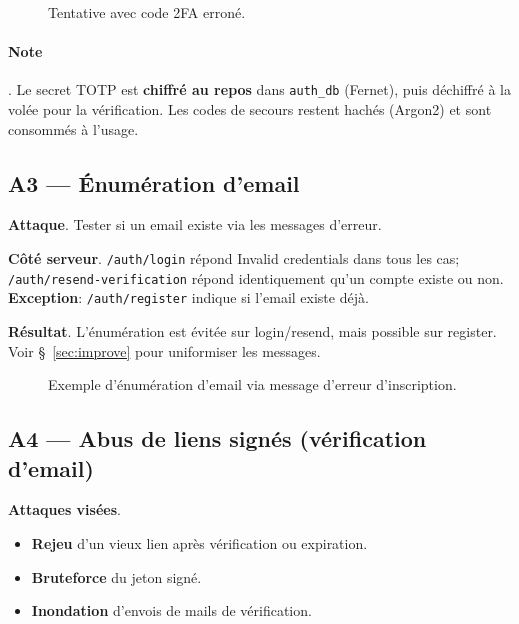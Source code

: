 \begin{figure}[h]
  \centering
  \caption{Tentative avec code 2FA erroné.}
\end{figure}

\paragraph{Note}. Le secret TOTP est \textbf{chiffré au repos} dans \texttt{auth\_db} (Fernet), puis déchiffré à la volée pour la vérification. Les codes de secours restent hachés (Argon2) et sont consommés à l'usage.

\subsection*{A3 — Énumération d'email}
\textbf{Attaque}. Tester si un email existe via les messages d'erreur.

\textbf{Côté serveur}. \texttt{/auth/login} répond \og Invalid credentials \fg{} dans tous les cas; \texttt{/auth/resend-verification} répond identiquement qu'un compte existe ou non. \textbf{Exception}: \texttt{/auth/register} indique si l'email existe déjà.

\textbf{Résultat}. L'énumération est évitée sur login/resend, mais possible sur register. Voir \S~\ref{sec:improve} pour uniformiser les messages.

\begin{figure}[h]
  \centering
  \caption{Exemple d'énumération d'email via message d'erreur d'inscription.}
\end{figure}

\subsection*{A4 — Abus de liens signés (vérification d'email)}
\textbf{Attaques visées}.
\begin{itemize}
  \item \textbf{Rejeu} d'un vieux lien après vérification ou expiration.
  \item \textbf{Bruteforce} du jeton signé.
  \item \textbf{Inondation} d'envois de mails de vérification.
\end{itemize}

